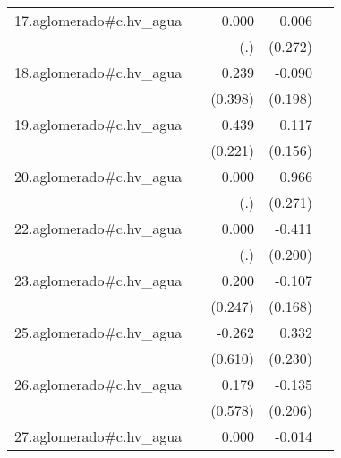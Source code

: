 {\begin{longtable}{l*{4}{D{.}{.}{-1}}}
\addlinespace
17.aglomerado#c.hv\_agua&                     &       0.000         &       0.006         &                     \\
            &                     &         (.)         &     (0.272)         &                     \\
\addlinespace
18.aglomerado#c.hv\_agua&                     &       0.239         &      -0.090         &                     \\
            &                     &     (0.398)         &     (0.198)         &                     \\
\addlinespace
19.aglomerado#c.hv\_agua&                     &       0.439\sym{*}  &       0.117         &                     \\
            &                     &     (0.221)         &     (0.156)         &                     \\
\addlinespace
20.aglomerado#c.hv\_agua&                     &       0.000         &       0.966\sym{***}&                     \\
            &                     &         (.)         &     (0.271)         &                     \\
\addlinespace
22.aglomerado#c.hv\_agua&                     &       0.000         &      -0.411\sym{*}  &                     \\
            &                     &         (.)         &     (0.200)         &                     \\
\addlinespace
23.aglomerado#c.hv\_agua&                     &       0.200         &      -0.107         &                     \\
            &                     &     (0.247)         &     (0.168)         &                     \\
\addlinespace
25.aglomerado#c.hv\_agua&                     &      -0.262         &       0.332         &                     \\
            &                     &     (0.610)         &     (0.230)         &                     \\
\addlinespace
26.aglomerado#c.hv\_agua&                     &       0.179         &      -0.135         &                     \\
            &                     &     (0.578)         &     (0.206)         &                     \\
\addlinespace
27.aglomerado#c.hv\_agua&                     &       0.000         &      -0.014         &                     \\

\end{longtable}}
